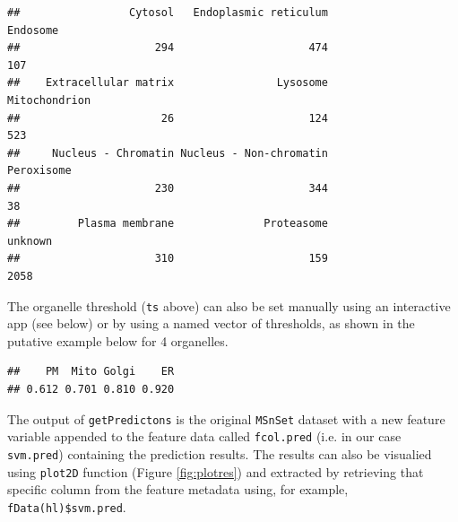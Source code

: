 \begin{knitrout}
\begin{kframe}
\begin{verbatim}
##                 Cytosol   Endoplasmic reticulum                Endosome 
##                     294                     474                     107 
##    Extracellular matrix                Lysosome           Mitochondrion 
##                      26                     124                     523 
##     Nucleus - Chromatin Nucleus - Non-chromatin              Peroxisome 
##                     230                     344                      38 
##         Plasma membrane              Proteasome                 unknown 
##                     310                     159                    2058
\end{verbatim}
\end{kframe}
\end{knitrout}

The organelle threshold (\texttt{ts} above) can also be set manually
using an interactive app (see below) or by using a named vector of
thresholds, as shown in the putative example below for 4 organelles.

\begin{knitrout}
\color{fgcolor}\begin{kframe}
\begin{alltt}
 \hlkwb{<-} \hlstd{(}\hlstd{(}\hlstd{,} \hlstd{,} \hlstd{,} \hlstd{),} \hlstd{(}\hlstd{,} \hlstd{,} \hlstd{,} \hlstd{)))}
\end{alltt}
\begin{verbatim}
##    PM  Mito Golgi    ER 
## 0.612 0.701 0.810 0.920
\end{verbatim}
\end{kframe}
\end{knitrout}

The output of \texttt{getPredictons} is the original \texttt{MSnSet}
dataset with a new feature variable appended to the feature data
called \texttt{fcol.pred} (i.e. in our case \texttt{svm.pred})
containing the prediction results. The results can also be visualied
using \texttt{plot2D} function (Figure \ref{fig:plotres}) and
extracted by retrieving that specific column from the feature metadata
using, for example, \texttt{fData(hl)\$svm.pred}.



